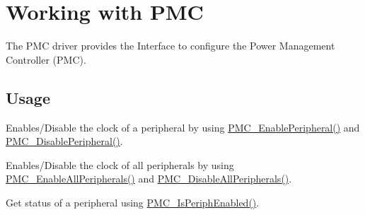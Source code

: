 \hypertarget{group__pmc__module}{}\section{Working with P\+MC}
\label{group__pmc__module}
The P\+MC driver provides the Interface to configure the Power Management Controller (P\+MC).\hypertarget{group__RTEMSBSPsARM_Usage}{}\subsection{Usage}\label{group__RTEMSBSPsARM_Usage}

\begin{DoxyItemize}
\item Enables/\+Disable the clock of a peripheral by using \mbox{\hyperlink{atsam_2contrib_2libraries_2libchip_2source_2pmc_8c_a4154148b8d69545bca1b5c868c004d49}{P\+M\+C\+\_\+\+Enable\+Peripheral()}} and \mbox{\hyperlink{atsam_2contrib_2libraries_2libchip_2source_2pmc_8c_a2bb6755e2bf15a75e193cb6510064fa4}{P\+M\+C\+\_\+\+Disable\+Peripheral()}}. 
\item Enables/\+Disable the clock of all peripherals by using \mbox{\hyperlink{atsam_2contrib_2libraries_2libchip_2source_2pmc_8c_a1595a66f22522f696080e9d3c68e1869}{P\+M\+C\+\_\+\+Enable\+All\+Peripherals()}} and \mbox{\hyperlink{atsam_2contrib_2libraries_2libchip_2source_2pmc_8c_a9c5caa48f71136fd064db7ed4b36549c}{P\+M\+C\+\_\+\+Disable\+All\+Peripherals()}}. 
\item Get status of a peripheral using \mbox{\hyperlink{atsam_2contrib_2libraries_2libchip_2source_2pmc_8c_a13d9ea02189cb126f06a7d9c7241314a}{P\+M\+C\+\_\+\+Is\+Periph\+Enabled()}}. 

\end{DoxyItemize}

